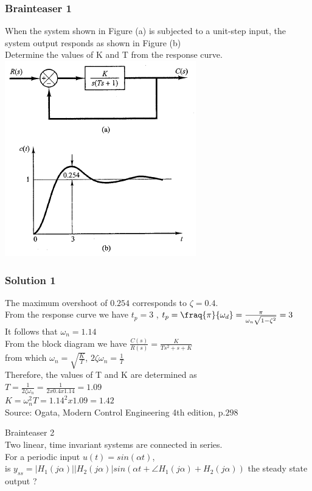 

\begin{frame}
\frametitle{Brainteaser 1}
When the system shown in Figure (a) is subjected to a unit-step input, the system output responds as shown in Figure (b)
\\Determine the values of K and T from the response curve.
\includegraphics[width=0.5\linewidth]{Afbeelding1}
\end{frame}

\begin{frame}
\frametitle{Solution 1}
The maximum overshoot of $0.254$ corresponds to $\zeta = 0.4$.
\\From the response curve we have $t_p = 3$
\Consequently, $t_p = \fraq{\pi}{\omega_d} = \frac{\pi}{\omega_n\sqrt{1-\zeta^2}} = 3$
\\It follows that $ \omega_n =1.14$
\\From the block diagram we have $\frac{C(s)}{R(s)} = \frac{K}{Ts^2 + s + K}$
\\from which $\omega_n = \sqrt{\frac{K}{T}}$, $2\zeta\omega_n = \frac{1}{T}$
\\ Therefore, the values of T and K are determined as
\\ $T = \frac{1}{2\zeta\omega_n} = \frac{1}{2 x 0.4 x 1.14} = 1.09$
\\ $K = \omega_n ^2 T = 1.14^2 x 1.09 = 1.42$
\\ Source: Ogata, Modern Control Engineering 4th edition, p.$298$ 
\end{frame}

\begin{frame}{Brainteaser 2}
\\ Two linear, time invariant systems are connected in series. 
\\ For a periodic input $u(t) = sin(\alpha t)$, 
\\ is $y_{ss}= |H_1(j\alpha)||H_2(j\alpha)|sin(\alpha t +	\angle H_1(j\alpha) + H_2(j\alpha))$ the steady state output ?
\end{frame}

